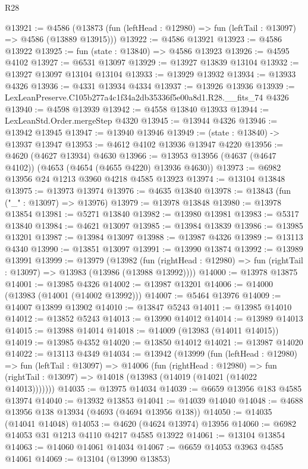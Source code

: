 \begin{lexlean}{R28}
\begin{coremodule}
@13921 := @4586
    (@13873 (fun (leftHead : @12980) => fun (leftTail : @13097) => @4586 (@13889 @13915)))
@13922 := @4586 @13921
@13923 := @4586 @13922
@13925 := fun (state : @13840) => @4586 @13923
@13926 := @4595 @4102
@13927 := @6531 @13097
@13929 := @13927 @13839 @13104
@13932 := @13927 @13097 @13104 @13104
@13933 := @13929 @13932
@13934 := @13933 @4326
@13936 := @4331 @13934 @4334
@13937 := @13926 @13936
@13939 := LexLeanPreserve.C105b277a4c1f34a2db35336f5e00a8d1.R28.__fits_74 @4326
@13940 := @4598 @13939
@13942 := @4558 @13840 @13933
@13944 := LexLeanStd.Order.mergeStep @4320
@13945 := @13944 @4326
@13946 := @13942 @13945
@13947 := @13940 @13946
@13949 := (state : @13840) -> @13937 @13947
@13953 := @4612 @4102 @13936 @13947 @4220
@13956 := @4620 (@4627 @13934) @4630
@13966 := @13953 @13956 (@4637 (@4647 @4102)) (@4653 (@4654 (@4655 @4220) @13936 @4630))
@13973 := @6982 @13956 @24 @1213 @3960 @4218 @4585 @13923
@13974 := @13104 @13848
@13975 := @13973 @13974
@13976 := @4635 @13840
@13978 := @13843 (fun ("_" : @13097) => @13976)
@13979 := @13978 @13848
@13980 := @13978 @13854
@13981 := @5271 @13840
@13982 := @13980 @13981
@13983 := @5317 @13840
@13984 := @4621 @13097
@13985 := @13984 @13839
@13986 := @13985 @13201
@13987 := @13984 @13097
@13988 := @13987 @4326
@13989 := @13113 @4340
@13990 := @13851 @13097
@13991 := @13990 @13874
@13992 := @13989 @13991
@13999 := @13979
    (@13982
      (fun (rightHead : @12980) => fun (rightTail : @13097) => @13983 (@13986 (@13988 @13992))))
@14000 := @13978 @13875
@14001 := @13985 @4326
@14002 := @13987 @13201
@14006 := @14000 (@13983 (@14001 (@14002 @13992)))
@14007 := @5464 @13976
@14009 := @14007 @13899 @13902
@14010 := @13847 @5243
@14011 := @13985 @14010
@14012 := @13852 @5243
@14013 := @13990 @14012
@14014 := @13989 @14013
@14015 := @13988 @14014
@14018 := @14009 (@13983 (@14011 @14015))
@14019 := @13985 @4352
@14020 := @13850 @14012
@14021 := @13987 @14020
@14022 := @13113 @4349
@14034 := @13942
    (@13999
      (fun (leftHead : @12980) =>
      fun (leftTail : @13097) =>
      @14006
        (fun (rightHead : @12980) =>
        fun (rightTail : @13097) => @14018 (@13983 (@14019 (@14021 (@14022 @14013)))))))
@14035 := @13975 @14034
@14039 := @6659 @13956 @183 @4585 @13974
@14040 := @13932 @13853
@14041 := @14039 @14040
@14048 := @4688 @13956 @138 @13934 (@4693 (@4694 @13956 @138))
@14050 := @14035 (@14041 @14048)
@14053 := @4620 (@4624 @13974) @13956
@14060 := @6982 @14053 @31 @1213 @4110 @4217 @4585 @13922
@14061 := @13104 @13854
@14063 := @14060 @14061 @14034
@14067 := @6659 @14053 @3963 @4585 @14061
@14069 := @13104 (@13990 @13853)

\end{coremodule}
\end{lexlean}
